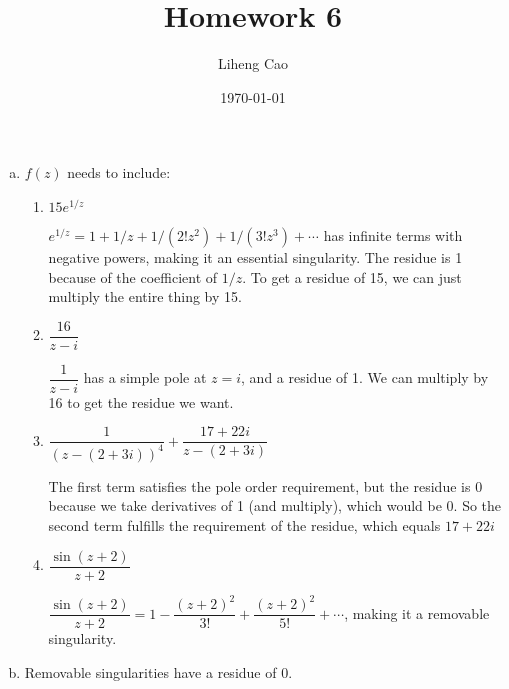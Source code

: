 \documentclass[12pt]{article}
\title{Homework 6} %
\author{Liheng Cao} %
\date{\today} %
\begin{document}
\maketitle

\section{}
\begin{enumerate}[a)]
	\item $ f(z) $ needs to include:
	\begin{enumerate}[1)]
		\item $ 15 e^{1/z} $
		\par$ e^{1/z} = 1 + 1/z + 1/(2!z^2) + 1/(3! z^3) + \cdots$ has infinite terms with negative powers, making it an essential singularity. The residue is 1 because of the coefficient of $ 1/z $. To get a residue of 15, we can just multiply the entire thing by 15.
		
		\item $ \dfrac{16}{z-i} $
		\par $ \dfrac{1}{z-i} $ has a simple pole at $ z=i $, and a residue of 1. We can multiply by 16 to get the residue we want.
		
		\item $ \dfrac{1}{(z-(2+3i))^4} + \dfrac{17+22i}{z-(2+3i)}$
		\par The first term satisfies the pole order requirement, but the residue is 0 because we take derivatives of 1 (and multiply), which would be 0. So the second term fulfills the requirement of the residue, which equals $ 17+22i $
		
		\item $ \dfrac{\sin(z+2)}{z+2} $
		\par $ \dfrac{\sin(z+2)}{z+2} = 1 - \dfrac{(z+2)^2}{3!} + \dfrac{(z+2)^2}{5!} + \cdots $, making it a removable singularity.	
	\end{enumerate}

	\item Removable singularities have a residue of 0.
\end{enumerate}
\newpage
\end{document}

